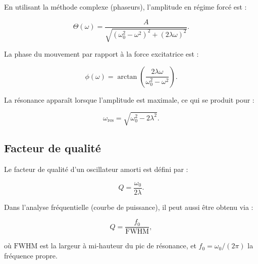 En utilisant la méthode complexe (phaseurs), l'amplitude en régime forcé est :

\begin{equation}
\Theta(\omega)
= \frac{A}{\sqrt{(\omega_0^2 - \omega^2)^2 + (2\lambda\omega)^2}}.
\label{eq:amplitude_forcee}
\end{equation}

La phase du mouvement par rapport à la force excitatrice est :

\begin{equation}
\phi(\omega)
= \arctan\!\left(\frac{2\lambda\omega}{\omega_0^2 - \omega^2}\right).
\label{eq:phase_forcee}
\end{equation}

La résonance apparaît lorsque l’amplitude est maximale, ce qui se produit pour :

\begin{equation}
\omega_{\mathrm{res}} = \sqrt{\omega_0^2 - 2\lambda^2}.
\label{eq:omega_res}
\end{equation}


\subsection{Facteur de qualité} \label{subsec:facteur_Q}

Le facteur de qualité d’un oscillateur amorti est défini par :

\begin{equation}
Q = \frac{\omega_0}{2\lambda}.
\label{eq:Q_lambda}
\end{equation}

Dans l’analyse fréquentielle (courbe de puissance), il peut aussi être obtenu via :

\begin{equation}
Q = \frac{f_0}{\mathrm{FWHM}},
\label{eq:Q_fwhm}
\end{equation}

où $\mathrm{FWHM}$ est la largeur à mi-hauteur du pic de résonance,
et $f_0 = \omega_0 / (2\pi)$ la fréquence propre.

